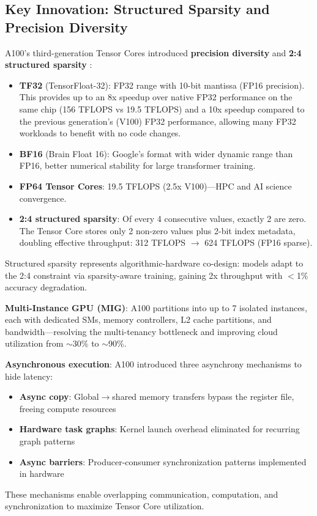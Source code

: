 \documentclass{article}
\begin{document}
\subsection{Key Innovation: Structured Sparsity and Precision Diversity}

A100's third-generation Tensor Cores introduced \textbf{precision diversity} and \textbf{2:4 structured sparsity} \cite{nvidia2020ampere,mishra2021accelerating}:

\begin{itemize}
\item \textbf{TF32} (TensorFloat-32): FP32 range with 10-bit mantissa (FP16 precision). This provides up to an 8x speedup over native FP32 performance on the same chip (156 TFLOPS vs 19.5 TFLOPS) and a 10x speedup compared to the previous generation's (V100) FP32 performance, allowing many FP32 workloads to benefit with no code changes.
\item \textbf{BF16} (Brain Float 16): Google's format with wider dynamic range than FP16, better numerical stability for large transformer training.
\item \textbf{FP64 Tensor Cores}: 19.5 TFLOPS (2.5x V100)—HPC and AI science convergence.
\item \textbf{2:4 structured sparsity}: Of every 4 consecutive values, exactly 2 are zero. The Tensor Core stores only 2 non-zero values plus 2-bit index metadata, doubling effective throughput: 312 TFLOPS $\to$ 624 TFLOPS (FP16 sparse).
\end{itemize}

Structured sparsity represents algorithmic-hardware co-design: models adapt to the 2:4 constraint via sparsity-aware training, gaining 2x throughput with $<$1\% accuracy degradation.

\textbf{Multi-Instance GPU (MIG)}: A100 partitions into up to 7 isolated instances, each with dedicated SMs, memory controllers, L2 cache partitions, and bandwidth—resolving the multi-tenancy bottleneck and improving cloud utilization from $\sim$30\% \cite{gpu_utilization_2020} to $\sim$90\%.

\textbf{Asynchronous execution}: A100 introduced three asynchrony mechanisms to hide latency:
\begin{itemize}
\item \textbf{Async copy}: Global$\to$shared memory transfers bypass the register file, freeing compute resources
\item \textbf{Hardware task graphs}: Kernel launch overhead eliminated for recurring graph patterns
\item \textbf{Async barriers}: Producer-consumer synchronization patterns implemented in hardware
\end{itemize}
These mechanisms enable overlapping communication, computation, and synchronization to maximize Tensor Core utilization.
\end{document}
